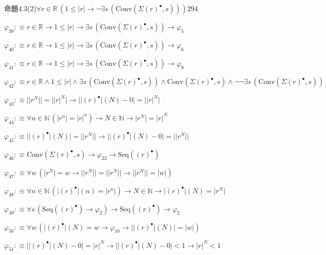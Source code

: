 \begin{fullproof}{命題4.3(2)}{$\forall r \in \mathbb{R}\,(1 \leq \lvert r \rvert \to \neg \exists s\,(\mathrm{Conv}(\Sigma {(r)^{\bullet}},s)))$}{294}
\begin{abbrevlist}
\item $\varphi_{39} :\equiv r \in \mathbb{R} \to 1 \leq \lvert r \rvert \to \exists s\,(\mathrm{Conv}(\Sigma {(r)^{\bullet}},s)) \to \varphi_{5}$
\item $\varphi_{40} :\equiv r \in \mathbb{R} \to 1 \leq \lvert r \rvert \to \exists s\,(\mathrm{Conv}(\Sigma {(r)^{\bullet}},s)) \to \varphi_{6}$
\item $\varphi_{41} :\equiv r \in \mathbb{R} \to 1 \leq \lvert r \rvert \to \exists s\,(\mathrm{Conv}(\Sigma {(r)^{\bullet}},s)) \to \varphi_{9}$
\item $\varphi_{42} :\equiv r \in \mathbb{R} \land 1 \leq \lvert r \rvert \land \exists s\,(\mathrm{Conv}(\Sigma {(r)^{\bullet}},s)) \land \mathrm{Conv}(\Sigma {(r)^{\bullet}},s) \land \neg \neg \exists s\,(\mathrm{Conv}(\Sigma {(r)^{\bullet}},s))$
\item $\varphi_{43} :\equiv \lvert \lvert {{r}^{N}} \rvert \rvert = \lvert {{\lvert r \rvert}^{N}} \rvert \to \lvert \lvert {(r)^{\bullet}} \rvert(N) - 0 \rvert = \lvert {{\lvert r \rvert}^{N}} \rvert$
\item $\varphi_{44} :\equiv \forall n \in \mathbb{N}\,(\lvert {{r}^{n}} \rvert = {{\lvert r \rvert}^{n}}) \to N \in \mathbb{N} \to \lvert {{r}^{N}} \rvert = {{\lvert r \rvert}^{N}}$
\item $\varphi_{45} :\equiv \lvert \lvert {(r)^{\bullet}} \rvert(N) \rvert = \lvert \lvert {{r}^{N}} \rvert \rvert \to \lvert \lvert {(r)^{\bullet}} \rvert(N) - 0 \rvert = \lvert \lvert {{r}^{N}} \rvert \rvert$
\item $\varphi_{46} :\equiv \mathrm{Conv}(\Sigma {(r)^{\bullet}},s) \to \varphi_{22} \to \mathrm{Seq}({(r)^{\bullet}})$
\item $\varphi_{47} :\equiv \forall w\,(\lvert {{r}^{N}} \rvert = w \to \lvert \lvert {{r}^{N}} \rvert \rvert = \lvert \lvert {{r}^{N}} \rvert \rvert \to \lvert \lvert {{r}^{N}} \rvert \rvert = \lvert w \rvert)$
\item $\varphi_{48} :\equiv \forall n \in \mathbb{N}\,(\lvert {(r)^{\bullet}} \rvert(n) = \lvert {{r}^{n}} \rvert) \to N \in \mathbb{N} \to \lvert {(r)^{\bullet}} \rvert(N) = \lvert {{r}^{N}} \rvert$
\item $\varphi_{49} :\equiv \forall s\,(\mathrm{Seq}({(r)^{\bullet}}) \to \varphi_{2}) \to \mathrm{Seq}({(r)^{\bullet}}) \to \varphi_{2}$
\item $\varphi_{50} :\equiv \forall w\,(\lvert {(r)^{\bullet}} \rvert(N) = w \to \varphi_{10} \to \lvert \lvert {(r)^{\bullet}} \rvert(N) \rvert = \lvert w \rvert)$
\item $\varphi_{51} :\equiv \lvert \lvert {(r)^{\bullet}} \rvert(N) - 0 \rvert = {{\lvert r \rvert}^{N}} \to \lvert \lvert {(r)^{\bullet}} \rvert(N) - 0 \rvert < 1 \to {{\lvert r \rvert}^{N}} < 1$

\end{abbrevlist}
\end{fullproof}

